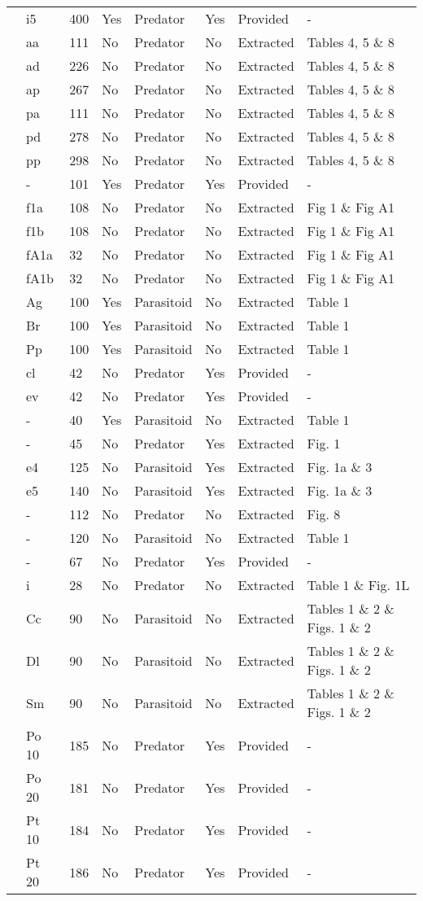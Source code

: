 \begin{longtable}{llllllll}
\citet{Elliott:2005aa}&i5&400&Yes&Predator&Yes&Provided&-\tabularnewline
\citet{Eveleigh:1982aa}&aa&111&No&Predator&No&Extracted&Tables 4, 5 \& 8\tabularnewline
\citet{Eveleigh:1982aa}&ad&226&No&Predator&No&Extracted&Tables 4, 5 \& 8\tabularnewline
\citet{Eveleigh:1982aa}&ap&267&No&Predator&No&Extracted&Tables 4, 5 \& 8\tabularnewline
\citet{Eveleigh:1982aa}&pa&111&No&Predator&No&Extracted&Tables 4, 5 \& 8\tabularnewline
\citet{Eveleigh:1982aa}&pd&278&No&Predator&No&Extracted&Tables 4, 5 \& 8\tabularnewline
\citet{Eveleigh:1982aa}&pp&298&No&Predator&No&Extracted&Tables 4, 5 \& 8\tabularnewline
\citet{Fussmann:2005aa}&-&101&Yes&Predator&Yes&Provided&-\tabularnewline
\citet{Griffen:2007aa}&f1a&108&No&Predator&No&Extracted&Fig 1 \& Fig A1\tabularnewline
\citet{Griffen:2007aa}&f1b&108&No&Predator&No&Extracted&Fig 1 \& Fig A1\tabularnewline
\citet{Griffen:2007aa}&fA1a&32&No&Predator&No&Extracted&Fig 1 \& Fig A1\tabularnewline
\citet{Griffen:2007aa}&fA1b&32&No&Predator&No&Extracted&Fig 1 \& Fig A1\tabularnewline
\citet{Hassan:1976aa}&Ag&100&Yes&Parasitoid&No&Extracted&Table 1\tabularnewline
\citet{Hassan:1976aa}&Br&100&Yes&Parasitoid&No&Extracted&Table 1\tabularnewline
\citet{Hassan:1976aa}&Pp&100&Yes&Parasitoid&No&Extracted&Table 1\tabularnewline
\citet{Hossie:2016aa}&cl&42&No&Predator&Yes&Provided&-\tabularnewline
\citet{Hossie:2016aa}&ev&42&No&Predator&Yes&Provided&-\tabularnewline
\citet{Huffaker:1982aa}&-&40&Yes&Parasitoid&No&Extracted&Table 1\tabularnewline
\citet{Johnson:2006aa}&-&45&No&Predator&Yes&Extracted&Fig. 1\tabularnewline
\citet{Jones:1988aa, Jones:1986aa}&e4&125&No&Parasitoid&Yes&Extracted&Fig. 1a \& 3\tabularnewline
\citet{Jones:1988aa, Jones:1986aa}&e5&140&No&Parasitoid&Yes&Extracted&Fig. 1a \& 3\tabularnewline
\citet{Katz:1985ai}&-&112&No&Predator&No&Extracted&Fig. 8\tabularnewline
\citet{Kfir:1983aa}&-&120&No&Parasitoid&No&Extracted&Table 1\tabularnewline
\citet{Kratina:2009aa}&-&67&No&Predator&Yes&Provided&-\tabularnewline
\citet{Krylov:1992aa}&i&28&No&Predator&No&Extracted&Table 1 \& Fig. 1L\tabularnewline
\citet{Kumar:1985aa}&Cc&90&No&Parasitoid&No&Extracted&Tables 1 \& 2 \& Figs. 1 \& 2\tabularnewline
\citet{Kumar:1985aa}&Dl&90&No&Parasitoid&No&Extracted&Tables 1 \& 2 \& Figs. 1 \& 2\tabularnewline
\citet{Kumar:1985aa}&Sm&90&No&Parasitoid&No&Extracted&Tables 1 \& 2 \& Figs. 1 \& 2\tabularnewline
\citet{Lang:2012aa}&Po 10&185&No&Predator&Yes&Provided&-\tabularnewline
\citet{Lang:2012aa}&Po 20&181&No&Predator&Yes&Provided&-\tabularnewline
\citet{Lang:2012aa}&Pt 10&184&No&Predator&Yes&Provided&-\tabularnewline
\citet{Lang:2012aa}&Pt 20&186&No&Predator&Yes&Provided&-\tabularnewline

\end{longtable}
